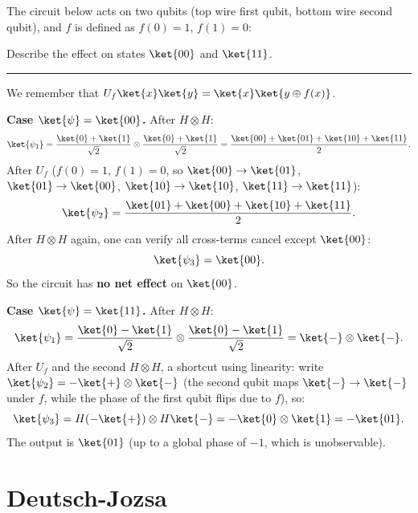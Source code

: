 \documentclass[oneside]{academica}
\begin{document}
\begin{exercise*}
  The circuit below acts on two qubits (top wire first qubit, bottom wire second qubit), and $f$ is defined as $f(0)=1$, $f(1)=0$:
  \begin{center}
    
  \end{center}
  Describe the effect on states $\ket{00}$ and $\ket{11}$.

  \textcolor{orange!140}{\rule{\textwidth}{1.5pt}}

  We remember that $U_f\ket{x}\ket{y}=\ket{x}\ket{y\oplus f(x)}$.

  \textbf{Case $\ket{\psi}=\ket{00}$.}
  After $H\otimes H$:
  \begin{equation*}
    \ket{\psi_1} = \frac{\ket{0}+\ket{1}}{\sqrt{2}}\otimes\frac{\ket{0}+\ket{1}}{\sqrt{2}}
    = \frac{\ket{00}+\ket{01}+\ket{10}+\ket{11}}{2}.
  \end{equation*}
  After $U_f$ ($f(0)=1$, $f(1)=0$, so $\ket{00}\to\ket{01}$, $\ket{01}\to\ket{00}$, $\ket{10}\to\ket{10}$, $\ket{11}\to\ket{11}$):
  \begin{equation*}
    \ket{\psi_2} = \frac{\ket{01}+\ket{00}+\ket{10}+\ket{11}}{2}.
  \end{equation*}
  After $H\otimes H$ again, one can verify all cross-terms cancel except $\ket{00}$:
  \begin{equation*}
    \ket{\psi_3} = \ket{00}.
  \end{equation*}
  So the circuit has \textbf{no net effect} on $\ket{00}$.

  \textbf{Case $\ket{\psi}=\ket{11}$.}
  After $H\otimes H$:
  \begin{equation*}
    \ket{\psi_1} = \frac{\ket{0}-\ket{1}}{\sqrt{2}}\otimes\frac{\ket{0}-\ket{1}}{\sqrt{2}} = \ket{-}\otimes\ket{-}.
  \end{equation*}
  After $U_f$ and the second $H\otimes H$, a shortcut using linearity: write $\ket{\psi_2}=-\ket{+}\otimes\ket{-}$ (the second qubit maps $\ket{-}\to\ket{-}$ under $f$, while the phase of the first qubit flips due to $f$), so:
  \begin{equation*}
    \ket{\psi_3} = H(-\ket{+})\otimes H\ket{-} = -\ket{0}\otimes\ket{1} = -\ket{01}.
  \end{equation*}
  The output is $\ket{01}$ (up to a global phase of $-1$, which is unobservable).
\end{exercise*}

\section{Deutsch-Jozsa}
\end{document}
